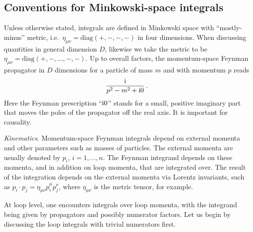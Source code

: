  
 \subsection{Conventions for Minkowski-space integrals}
 \label{sec:ConventionsCh4}

Unless otherwise stated, integrals are defined in Minkowski
space with ``mostly-minus'' metric, i.e.\ $\eta_{\mu\nu}=\text{diag}(+,-,-,-)$ in four dimensions.
When discussing quantities in general dimension $D$, likewise we take the metric to be $\eta_{\mu\nu}=\text{diag}(+,-,\ldots,-,-)$.
Up to overall factors, the  momentum-space Feynman propagator in $D$ dimensions for a particle of mass $m$ and with momentum $p$ reads 
\begin{align}
\frac{\mathrm{i}}{p^2 -m^2 + \mathrm{i} 0}\,.
\end{align}
Here the Feynman prescription ``$\mathrm{i} 0$'' stands for a small, positive imaginary part that moves the poles of the propagator off the real axis. It is important for causality.

\smallskip

{\it Kinematics}. Momentum-space Feynman integrals depend on external momenta and other parameters such as masses of particles. 
The external momenta are usually denoted by $p_{i}$, $i=1,\ldots, n$. The Feynman integrand depends on these momenta, and in addition on loop momenta, that are integrated over. The result of the integration depends on the external momenta via Lorentz invariants, such as $p_i \cdot p_j = \eta_{\mu \nu} p^{\mu}_{i} p^{\nu}_{j}$, where $\eta_{\mu \nu}$ is the metric tensor, for example.

\smallskip

At loop level, one encounters integrals over loop momenta, with the
integrand being given by propagators and possibly numerator 
factors. Let us begin by discussing the loop integrals with trivial
numerators first.

